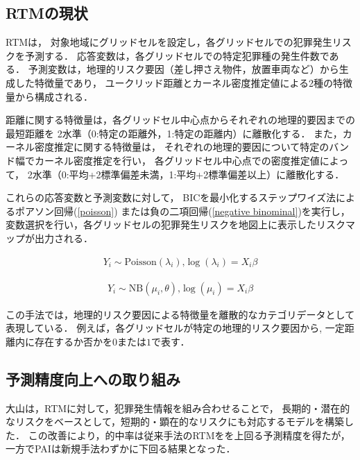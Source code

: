 \subsection{RTMの現状}
\label{conventional-method}
RTM\cite{caplan2015risk}は，
対象地域にグリッドセルを設定し，各グリッドセルでの犯罪発生リスクを予測する．
応答変数は，各グリッドセルでの特定犯罪種の発生件数である．
予測変数は，地理的リスク要因（差し押さえ物件，放置車両など）から生成した特徴量であり，
ユークリッド距離とカーネル密度推定値による2種の特徴量から構成される．

距離に関する特徴量は，各グリッドセル中心点からそれぞれの地理的要因までの最短距離を
2水準（0:特定の距離外，1:特定の距離内）に離散化する．
また，カーネル密度推定に関する特徴量は，
それぞれの地理的要因について特定のバンド幅でカーネル密度推定を行い，
各グリッドセル中心点での密度推定値によって，
2水準（0:平均+2標準偏差未満，1:平均+2標準偏差以上）に離散化する．

これらの応答変数と予測変数に対して，
BICを最小化するステップワイズ法\cite{islp}によるポアソン回帰\cite{poisson}(\ref{poisson})
または負の二項回帰\cite{Hilbe_2011}(\ref{negative binominal})を実行し，
変数選択を行い，各グリッドセルの犯罪発生リスクを地図上に表示したリスクマップが出力される．

\begin{align}\label{poisson}
   Y_i \sim \text{Poisson}(\lambda_i) \text{,}
   \log(\lambda_i) = X_i \beta 
 \end{align}
 
 \begin{align}\label{negative binominal}
   Y_i \sim \text{NB}(\mu_i, \theta) \text{,}
   \log(\mu_i) = X_i \beta 
 \end{align}
 
 この手法では，地理的リスク要因による特徴量を離散的なカテゴリデータとして表現している．
 例えば，各グリッドセルが特定の地理的リスク要因から,
 一定距離内に存在するか否かを$0$または$1$で表す．

\subsection{予測精度向上への取り組み}
大山\cite{大山智也2020日本}は，RTMに対して，犯罪発生情報を組み合わせることで，
長期的・潜在的なリスクをベースとして，短期的・顕在的なリスクにも対応するモデルを構築した．
この改善により，的中率は従来手法のRTMをを上回る予測精度を得たが，
一方でPAIは新規手法わずかに下回る結果となった．

